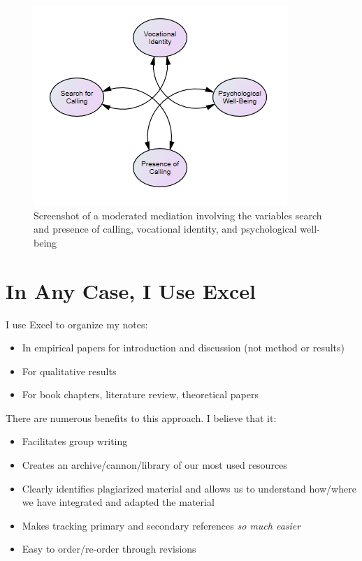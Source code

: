 \documentclass[
  english,
]{book}
\providecommand{\tightlist}{%
  \setlength{\itemsep}{0pt}\setlength{\parskip}{0pt}}
\begin{document}
\begin{figure}
\centering
\includegraphics{images/Excel/Middle.png}
\caption{Screenshot of a moderated mediation involving the variables search and presence of calling, vocational identity, and psychological well-being}
\end{figure}

\hypertarget{in-any-case-i-use-excel}{%
\section{In Any Case, I Use Excel}\label{in-any-case-i-use-excel}}

I use Excel to organize my notes:

\begin{itemize}
\tightlist
\item
  In empirical papers for introduction and discussion (not method or results)
\item
  For qualitative results
\item
  For book chapters, literature review, theoretical papers
\end{itemize}

There are numerous benefits to this approach. I believe that it:

\begin{itemize}
\tightlist
\item
  Facilitates group writing
\item
  Creates an archive/cannon/library of our most used resources
\item
  Clearly identifies plagiarized material and allows us to understand how/where we have integrated and adapted the material
\item
  Makes tracking primary and secondary references \emph{so much easier}
\item
  Easy to order/re-order through revisions
\end{itemize}
\end{document}

